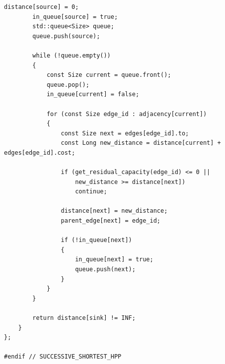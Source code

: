 \begin{lstlisting}[caption={Implementação em C++ do algoritmo \textit{Successive Shortest Path} com SPFA.}, label={lst:successive_shortest}]
		distance[source] = 0;
		in_queue[source] = true;
		std::queue<Size> queue;
		queue.push(source);

		while (!queue.empty())
		{
			const Size current = queue.front();
			queue.pop();
			in_queue[current] = false;

			for (const Size edge_id : adjacency[current])
			{
				const Size next = edges[edge_id].to;
				const Long new_distance = distance[current] + edges[edge_id].cost;

				if (get_residual_capacity(edge_id) <= 0 ||
				    new_distance >= distance[next])
					continue;

				distance[next] = new_distance;
				parent_edge[next] = edge_id;

				if (!in_queue[next])
				{
					in_queue[next] = true;
					queue.push(next);
				}
			}
		}

		return distance[sink] != INF;
	}
};

#endif // SUCCESSIVE_SHORTEST_HPP
\end{lstlisting}
